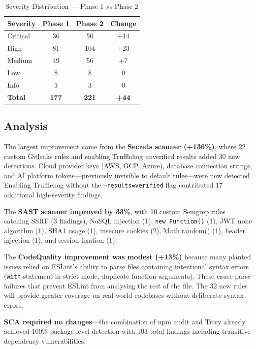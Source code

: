 \documentclass[12pt,a4paper]{report}
\begin{document}
\begin{table}[H]
\centering
\caption{Severity Distribution --- Phase 1 vs Phase 2}
\label{tab:severity_change}
\begin{tabular}{|l|c|c|c|}
\hline
\textbf{Severity} & \textbf{Phase 1} & \textbf{Phase 2} & \textbf{Change} \\
\hline
Critical & 36 & 50 & +14 \\
\hline
High & 81 & 104 & +23 \\
\hline
Medium & 49 & 56 & +7 \\
\hline
Low & 8 & 8 & 0 \\
\hline
Info & 3 & 3 & 0 \\
\hline
\textbf{Total} & \textbf{177} & \textbf{221} & \textbf{+44} \\
\hline
\end{tabular}
\end{table}

\subsection{Analysis}

The largest improvement came from the \textbf{Secrets scanner (+136\%)}, where 22 custom Gitleaks rules and enabling Trufflehog unverified results added 30 new detections. Cloud provider keys (AWS, GCP, Azure), database connection strings, and AI platform tokens---previously invisible to default rules---were now detected. Enabling Trufflehog without the \texttt{--results=verified} flag contributed 17 additional high-severity findings.

The \textbf{SAST scanner improved by 33\%}, with 10 custom Semgrep rules catching SSRF (3 findings), NoSQL injection (1), \texttt{new Function()} (1), JWT none algorithm (1), SHA1 usage (1), insecure cookies (2), Math.random() (1), header injection (1), and session fixation (1).

The \textbf{CodeQuality improvement was modest (+13\%)} because many planted issues relied on ESLint's ability to parse files containing intentional syntax errors (\texttt{with} statement in strict mode, duplicate function arguments). These cause parse failures that prevent ESLint from analysing the rest of the file. The 32 new rules will provide greater coverage on real-world codebases without deliberate syntax errors.

\textbf{SCA required no changes}---the combination of npm audit and Trivy already achieved 100\% package-level detection with 103 total findings including transitive dependency vulnerabilities.
\end{document}
